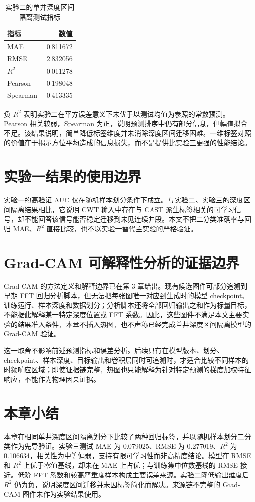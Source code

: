 \begin{table}[htbp]
  \centering
  \caption{实验二的单井深度区间隔离测试指标}
  \label{tab:exp2-metrics}
  \begin{tabular}{lr}
    \toprule
    指标 & 数值 \\
    \midrule
    MAE & 0.811672 \\
    RMSE & 2.832056 \\
    $R^2$ & -0.011278 \\
    Pearson & 0.198048 \\
    Spearman & 0.413335 \\
    \bottomrule
  \end{tabular}
\end{table}

负 $R^2$ 表明实验二在平方误差意义下未优于以测试均值为参照的常数预测。Pearson 相关较弱，Spearman 为正，说明预测排序中仍有部分信息，但幅值拟合不足。该结果说明，简单降低标签维度并未消除深度区间迁移困难。一维标签对照的价值在于揭示方位平均造成的信息损失，而不是提供比实验三更强的性能结论。

\section{实验一结果的使用边界}

实验一的高验证 AUC 仅在随机样本划分条件下成立。与实验二、实验三的深度区间隔离结果相比，它说明 CWT 输入中存在与 CAST 派生标签相关的可学习信号，却不能回答该信号能否稳定迁移到未见连续井段。本文不把二分类准确率与回归 MAE、$R^2$ 直接比较，也不以实验一替代主实验的严格验证。

\section{Grad-CAM 可解释性分析的证据边界}

Grad-CAM 的方法定义和解释边界已在第 3 章给出\cite{Selvaraju2017GradCAM}。现有候选图件可部分追溯到早期 FFT 回归分析脚本，但无法把每张图唯一对应到生成时的模型 checkpoint、训练运行、样本深度和数据划分；分析脚本还将全部回归输出之和作为标量目标，不能据此解释某一特定深度位置或 FFT 系数。因此，这些图件不满足本文主要实验的结果准入条件，本章不插入热图，也不声称已经完成单井深度区间隔离模型的 Grad-CAM 验证。

这一取舍不影响前述预测指标和误差分析。后续只有在模型版本、划分、checkpoint、样本深度、目标输出和卷积层同时可追溯时，才适合比较不同样本的时频响应区域；即使证据链完整，热图也只能解释为针对特定预测的梯度加权特征响应，不能作为物理因果证据。

\section{本章小结}

本章在相同单井深度区间隔离划分下比较了两种回归标签，并以随机样本划分二分类作为先导验证。实验三测试 MAE 为 0.079025、RMSE 为 0.277019、$R^2$ 为 0.106634，相关性为中等偏弱，支持有限可学习性而非高精度结论。模型在 RMSE 和 $R^2$ 上优于零值基线，却未在 MAE 上占优；与训练集中位数基线的 RMSE 接近。低阶 FFT 系数和较高严重度样本构成主要误差来源。实验二降低输出维度后 $R^2$ 仍为负，说明深度区间迁移并未因标签简化而解决。来源链不完整的 Grad-CAM 图件未作为实验结果使用。
